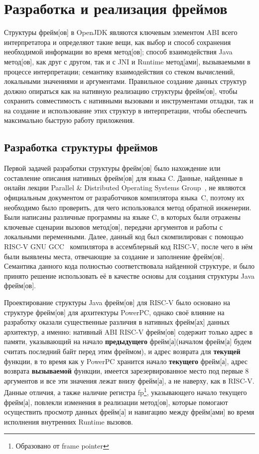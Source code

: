 \section{Разработка и реализация фреймов}

Структуры \gls{фрейм}[ов] в OpenJDK являются ключевым элементом ABI всего интерпретатора и определяют такие вещи, как выбор и способ сохранения необходимой информации во время  \gls{метод}[ов]; способ взаимодействия Java \gls{метод}[ов], как друг с другом, так и с JNI и Runtime \gls{метод}[ами], вызываемыми в процессе интерпретации; семантику взаимодействия со стеком вычислений, локальными значениями и аргументами. Правильное создание данных структур должно опираться как на нативную реализацию структуры \gls{фрейм}[ов], чтобы сохранить совместимость с нативными вызовами и инструментами отладки, так и на создание и использование этих структур в интерпретации, чтобы обеспечить максимально быструю работу приложения.


\subsection{Разработка структуры фреймов}

Первой задачей разработки структуры \gls{фрейм}[ов] было нахождение или составление описания нативных \gls{фрейм}[ов] для языка C. Данные, найденные в онлайн лекции Parallel \& Distributed Operating Systems Group~\cite{lecture_frames}, не являются официальным документом от разработчиков компилятора языка~C, поэтому их необходимо было проверить, для чего использовался \gls{метод} обратной инженерии. Были написаны различные программы на языке C, в которых были отражены ключевые сценарии вызовов \gls{метод}[ов], передачи аргументов и работы с локальными переменными. Далее, данный код был скомпилирован с помощью RISC-V GNU GCC~\cite{riscv:gnu} компилятора в ассемблерный код RISC-V, после чего в нём были выявлены места, отвечающие за создание и заполнение \gls{фрейм}[ов]. Семантика данного кода полностью соответствовала найденной структуре, и было принято решение использовать её в качестве основы для создания структуры Java \gls{фрейм}[ов]. 

Проектирование структуры Java \gls{фрейм}[ов] для RISC-V было основано на структуре \gls{фрейм}[ов] для архитектуры PowerPC, однако своё влияние на разработку оказали существенные различия в нативных \gls{фрейм}[ах] данных архитектур, а именно: нативный ABI RISC-V \gls{фрейм}[ов] содержит только адрес в памяти, указывающий на начало \textbf{предыдущего} \gls{фрейм}[а](началом \gls{фрейм}[а] будем считать последний байт перед этим фреймом), и адрес возврата для \textbf{текущей} функции, в то время как у PowerPC хранится начало \textbf{текущего} \gls{фрейм}[а], адрес возврата \textbf{вызываемой} функции, имеется зарезервированное место под первые 8 аргументов и все эти значения лежат внизу \gls{фрейм}[а], а не наверху, как в RISC-V.
Данные отличия, а также наличие регистра fp\footnote{Образовано от frame pointer}, указывающего начало текущего \gls{фрейм}[а], повлекли изменения в реализации \gls{метод}[ов], которые помогают осуществить просмотр данных \gls{фрейм}[а] и навигацию между \gls{фрейм}[ами] во время исполнения внутренних Runtime вызовов.


